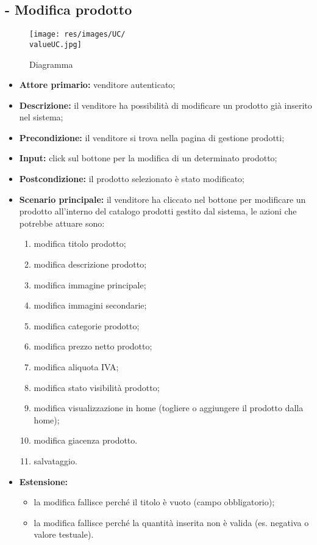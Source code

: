 \stepUserCase
\subsection{- Modifica prodotto}
\begin{figure}[H]
    \centering
    \texttt{[image: res/images/UC/\\valueUC.jpg]}
    \caption{Diagramma }
\end{figure}
\begin{itemize}
    \item \textbf{Attore primario:} venditore autenticato;
    \item \textbf{Descrizione:} il venditore ha possibilità di modificare un prodotto già inserito nel sistema;
    \item \textbf{Precondizione:} il venditore si trova nella pagina di gestione prodotti;
    \item \textbf{Input:} click sul bottone per la modifica di un determinato prodotto;
    \item \textbf{Postcondizione:} il prodotto selezionato è stato modificato;
    \item \textbf{Scenario principale:} il venditore ha cliccato nel bottone per modificare un prodotto all'interno del catalogo prodotti gestito dal sistema, le azioni che potrebbe attuare sono:
          \begin{enumerate}
              \item modifica titolo prodotto;
              \item modifica descrizione prodotto;
              \item modifica immagine principale;
              \item modifica immagini secondarie;
              \item modifica categorie prodotto;
              \item modifica prezzo netto prodotto;
              \item modifica aliquota IVA;
              \item modifica stato visibilità prodotto;
              \item modifica visualizzazione in home (togliere o aggiungere il prodotto dalla home);
              \item modifica giacenza prodotto.
              \item salvataggio.
          \end{enumerate}
    \item \textbf{Estensione:}
          \begin{itemize}
              \item la modifica fallisce perché il titolo è vuoto (campo obbligatorio);
              \item la modifica fallisce perché la quantità inserita non è valida (es. negativa o valore testuale).
          \end{itemize}
\end{itemize}

